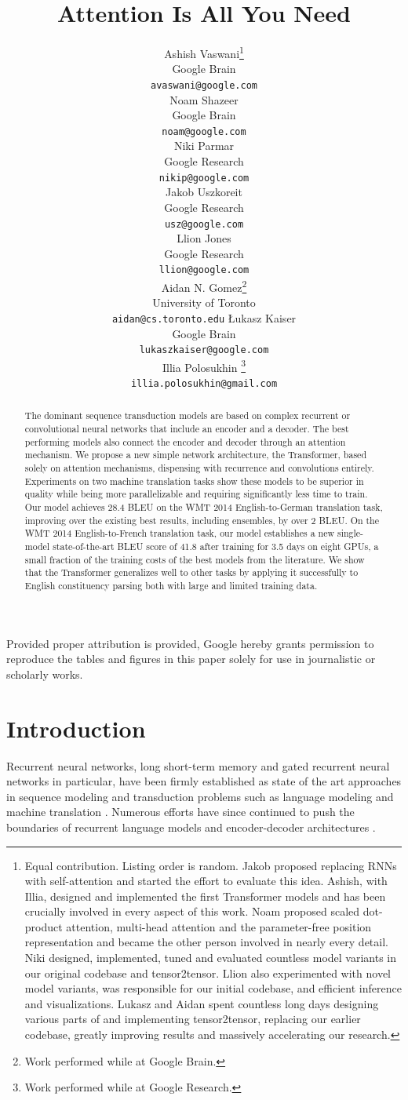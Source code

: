 \documentclass{article}
\title{Attention Is All You Need}
\author{
  \AND
  Ashish Vaswani\thanks{Equal contribution. Listing order is random. Jakob proposed replacing RNNs with self-attention and started the effort to evaluate this idea.
Ashish, with Illia, designed and implemented the first Transformer models and has been crucially involved in every aspect of this work. Noam proposed scaled dot-product attention, multi-head attention and the parameter-free position representation and became the other person involved in nearly every detail. Niki designed, implemented, tuned and evaluated countless model variants in our original codebase and tensor2tensor. Llion also experimented with novel model variants, was responsible for our initial codebase, and efficient inference and visualizations. Lukasz and Aidan spent countless long days designing various parts of and implementing tensor2tensor, replacing our earlier codebase, greatly improving results and massively accelerating our research.
}\\
  Google Brain\\
  \texttt{avaswani@google.com}\\
  \And
  Noam Shazeer\footnotemark[1]\\
  Google Brain\\
  \texttt{noam@google.com}\\
  \And
  Niki Parmar\footnotemark[1]\\
  Google Research\\
  \texttt{nikip@google.com}\\  
  \And
  Jakob Uszkoreit\footnotemark[1]\\
  Google Research\\
  \texttt{usz@google.com}\\
  \And  
  Llion Jones\footnotemark[1]\\
  Google Research\\
  \texttt{llion@google.com}\\   
  \And
  Aidan N. Gomez\footnotemark[1] \hspace{1.7mm}\thanks{Work performed while at Google Brain.}\\
  University of Toronto\\
  \texttt{aidan@cs.toronto.edu}
  \And
  {\L}ukasz Kaiser\footnotemark[1]\\
  Google Brain\\
  \texttt{lukaszkaiser@google.com}\\
  \And
  Illia Polosukhin\footnotemark[1]\hspace{1.7mm} \thanks{Work performed while at Google Research.}\\
  \texttt{illia.polosukhin@gmail.com}\\  
}
\begin{document}
\begin{center}
    \color{red}
    \large Provided proper attribution is provided, Google hereby grants permission to reproduce the tables and figures in this paper solely for use in journalistic or scholarly works.
\end{center}

\maketitle

\begin{abstract}
The dominant sequence transduction models are based on complex recurrent or convolutional neural networks that include an encoder and a decoder. The best performing models also connect the encoder and decoder through an attention mechanism. We propose a new simple network architecture, the Transformer, based solely on attention mechanisms, dispensing with recurrence and convolutions entirely. Experiments on two machine translation tasks show these models to be superior in quality while being  more parallelizable and requiring significantly less time to train. Our model achieves 28.4 BLEU on the WMT 2014 English-to-German translation task, improving over the existing best results, including ensembles, by over 2 BLEU.  On the WMT 2014 English-to-French translation task, our model establishes a new single-model state-of-the-art BLEU score of 41.8 after training for 3.5 days on eight GPUs, a small fraction of the training costs of the best models from the literature. We show that the Transformer generalizes well to other tasks by applying it successfully to English constituency parsing  both with large and limited training data.

\end{abstract}

\section{Introduction}

Recurrent neural networks, long short-term memory \citep{hochreiter1997} and gated recurrent \citep{gruEval14} neural networks in particular, have been firmly established as state of the art approaches in sequence modeling and transduction problems such as language modeling and machine translation \citep{sutskever14, bahdanau2014neural, cho2014learning}. Numerous efforts have since continued to push the boundaries of recurrent language models and encoder-decoder architectures \citep{wu2016google,luong2015effective,jozefowicz2016exploring}.
\end{document}
